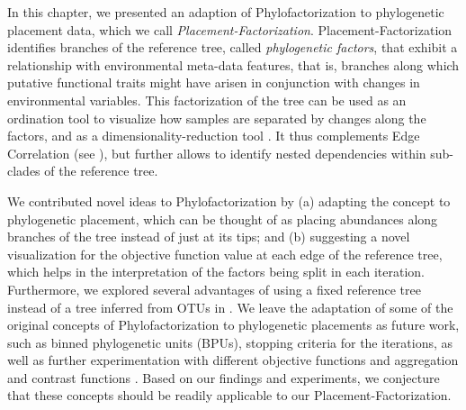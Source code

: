 In this chapter, we presented an adaption of Phylofactorization \cite{Washburne2017a,Washburne2019}
to phylogenetic placement data, which we call \emph{Placement-Factorization}.
Placement-Factorization identifies branches of the reference tree, called \emph{phylogenetic factors},
that exhibit a relationship with environmental meta-data features, that is,
branches along which putative functional traits might have arisen in conjunction with changes in environmental variables.
This factorization of the tree can be used as an ordination tool to visualize
how samples are separated by changes along the factors,
and as a dimensionality-reduction tool \cite{Washburne2017a}.
It thus complements Edge Correlation (see ), %
but further allows to identify nested dependencies within sub-clades of the reference tree.


We contributed novel ideas to Phylofactorization by
(a) adapting the concept to phylogenetic placement,
which can be thought of as placing abundances along branches of the tree instead of just at its tips;
and (b) suggesting a novel visualization for the objective function value at each edge of the reference tree,
which helps in the interpretation of the factors being split in each iteration.
Furthermore, we explored several advantages of using a fixed reference tree instead of a tree inferred from OTUs
in .
We leave the adaptation of some of the original concepts of Phylofactorization to phylogenetic placements
as future work, such as binned phylogenetic units (BPUs), stopping criteria for the iterations,
as well as further experimentation with different objective functions and aggregation and contrast functions
\cite{Washburne2017a,Washburne2018}.
Based on our findings and experiments,
we conjecture that these concepts should be readily applicable to our Placement-Factorization.

